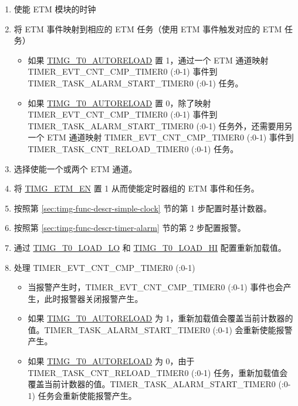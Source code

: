 \documentclass[main\_\_CN.tex]{subfiles}
\begin{document}
\begin{enumerate}
    \item 使能 ETM 模块的时钟
    \item 将 ETM 事件映射到相应的 ETM 任务（使用 ETM 事件触发对应的 ETM 任务）
    \begin{itemize}
        \item 如果 \hyperref[fielddesc:TIMGTXAUTORELOAD]{TIMG\_T0\_AUTORELOAD} 置 1，通过一个 ETM 通道映射 TIMER\_EVT\_CNT\_CMP\_TIMER0 (:0-1) 事件到 TIMER\_TASK\_ALARM\_START\_TIMER0 (:0-1) 任务。
        \item 如果 \hyperref[fielddesc:TIMGTXAUTORELOAD]{TIMG\_T0\_AUTORELOAD} 置 0，除了映射 TIMER\_EVT\_CNT\_CMP\_TIMER0 (:0-1) 事件到 TIMER\_TASK\_ALARM\_START\_TIMER0 (:0-1) 任务外，还需要用另一个 ETM 通道映射  TIMER\_EVT\_CNT\_CMP\_TIMER0 (:0-1) 事件到 TIMER\_TASK\_CNT\_RELOAD\_TIMER0 (:0-1) 任务。
    \end{itemize}
    \item 选择使能一个或两个 ETM 通道。
    \item 将 \hyperref[fielddesc:TIMGETMEN]{TIMG\_ETM\_EN} 置 1 从而使能定时器组的 ETM 事件和任务。
    \item 按照第 \ref{sec:timg-func-descr-simple-clock} 节的第 1 步配置时基计数器。
    \item 按照第 \ref{sec:timg-func-descr-timer-alarm} 节的第 2 步配置报警。
    \item 通过 \hyperref[fielddesc:TIMGTXLOADLO]{TIMG\_T0\_LOAD\_LO} 和 \hyperref[fielddesc:TIMGTXLOADHI]{TIMG\_T0\_LOAD\_HI} 配置重新加载值。
    \item 处理 TIMER\_EVT\_CNT\_CMP\_TIMER0 (:0-1)
    \begin{itemize}
        \item 当报警产生时，TIMER\_EVT\_CNT\_CMP\_TIMER0 (:0-1) 事件也会产生，此时报警器关闭报警产生。
        \item 如果 \hyperref[fielddesc:TIMGTXAUTORELOAD]{TIMG\_T0\_AUTORELOAD} 为 1，重新加载值会覆盖当前计数器的值。TIMER\_TASK\_ALARM\_START\_TIMER0 (:0-1) 会重新使能报警产生。
        \item 如果 \hyperref[fielddesc:TIMGTXAUTORELOAD]{TIMG\_T0\_AUTORELOAD} 为 0，由于 TIMER\_TASK\_CNT\_RELOAD\_TIMER0 (:0-1) 任务，重新加载值会覆盖当前计数器的值。TIMER\_TASK\_ALARM\_START\_TIMER0 (:0-1) 任务会重新使能报警产生。

\end{itemize}
\end{enumerate}
\end{document}
